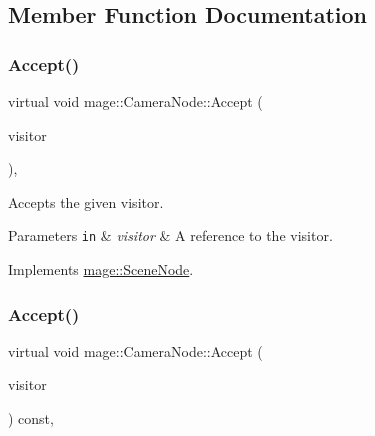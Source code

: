 \subsection{Member Function Documentation}
\hypertarget{classmage_1_1_camera_node_aed9c3c12cc4163fed880c49e43380efe}{}\label{classmage_1_1_camera_node_aed9c3c12cc4163fed880c49e43380efe} 
\subsubsection{\texorpdfstring{Accept()}{Accept()}\hspace{0.1cm}{\footnotesize\ttfamily [1/2]}}
{\footnotesize\ttfamily virtual void mage\+::\+Camera\+Node\+::\+Accept (\begin{DoxyParamCaption}\item[{\hyperlink{classmage_1_1_scene_node_visitor}{Scene\+Node\+Visitor} \&}]{visitor }\end{DoxyParamCaption})\hspace{0.3cm}{\ttfamily [override]}, {\ttfamily [virtual]}}

Accepts the given visitor.


\begin{DoxyParams}[1]{Parameters}
\mbox{\tt in}  & {\em visitor} & A reference to the visitor. \\
\hline
\end{DoxyParams}


Implements \hyperlink{classmage_1_1_scene_node_a32ed8763c8f8b4caa155f64551d96f13}{mage\+::\+Scene\+Node}.

\hypertarget{classmage_1_1_camera_node_a8b94f57b3a04f70b2c04a3d7c1ba3082}{}\label{classmage_1_1_camera_node_a8b94f57b3a04f70b2c04a3d7c1ba3082} 
\subsubsection{\texorpdfstring{Accept()}{Accept()}\hspace{0.1cm}{\footnotesize\ttfamily [2/2]}}
{\footnotesize\ttfamily virtual void mage\+::\+Camera\+Node\+::\+Accept (\begin{DoxyParamCaption}\item[{\hyperlink{classmage_1_1_scene_node_visitor}{Scene\+Node\+Visitor} \&}]{visitor }\end{DoxyParamCaption}) const\hspace{0.3cm}{\ttfamily [override]}, {\ttfamily [virtual]}}

